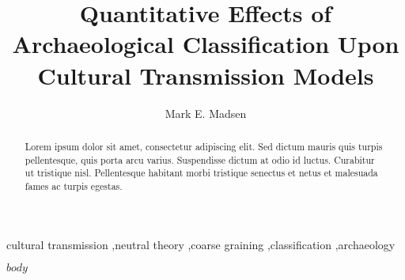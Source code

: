 \documentclass[preprint,times,authoryear,12pt]{elsarticle}
\begin{document}
\begin{frontmatter}


\title{Quantitative Effects of Archaeological Classification Upon Cultural Transmission Models}

\author{Mark E. Madsen}
\address{Department of Anthropology, Box 353100, University of Washington, Seattle WA, 98195 USA}

\begin{abstract}
Lorem ipsum dolor sit amet, consectetur adipiscing elit. Sed dictum mauris quis turpis pellentesque, quis porta arcu varius. Suspendisse dictum at odio id luctus. Curabitur ut tristique nisl. Pellentesque habitant morbi tristique senectus et netus et malesuada fames ac turpis egestas.  
\end{abstract}

\begin{keyword}
cultural transmission \sep neutral theory \sep coarse graining \sep classification \sep archaeology
\end{keyword}


\end{frontmatter}

$body$





\end{document}
